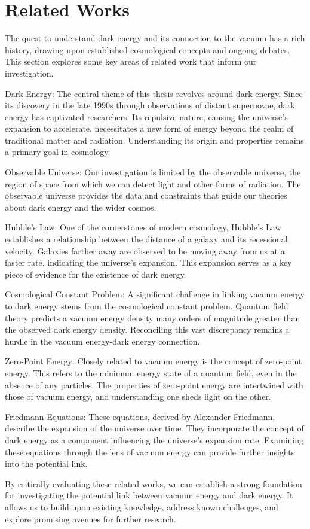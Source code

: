\section{Related Works}
The quest to understand dark energy and its connection to the vacuum has a rich history, drawing upon established cosmological concepts and ongoing debates. This section explores some key areas of related work that inform our investigation.

Dark Energy: The central theme of this thesis revolves around dark energy. Since its discovery in the late 1990s through observations of distant supernovae, dark energy has captivated researchers. Its repulsive nature, causing the universe's expansion to accelerate, necessitates a new form of energy beyond the realm of traditional matter and radiation. Understanding its origin and properties remains a primary goal in cosmology.

Observable Universe:  Our investigation is limited by the observable universe, the region of space from which we can detect light and other forms of radiation.  The observable universe provides the data and constraints that guide our theories about dark energy and the wider cosmos.

Hubble's Law:  One of the cornerstones of modern cosmology, Hubble's Law establishes a relationship between the distance of a galaxy and its recessional velocity. Galaxies farther away are observed to be moving away from us at a faster rate, indicating the universe's expansion. This expansion serves as a key piece of evidence for the existence of dark energy.

Cosmological Constant Problem:  A significant challenge in linking vacuum energy to dark energy stems from the cosmological constant problem. Quantum field theory predicts a vacuum energy density many orders of magnitude greater than the observed dark energy density. Reconciling this vast discrepancy remains a hurdle in the vacuum energy-dark energy connection.

Zero-Point Energy:  Closely related to vacuum energy is the concept of zero-point energy. This refers to the minimum energy state of a quantum field, even in the absence of any particles.  The properties of zero-point energy are intertwined with those of vacuum energy, and understanding one sheds light on the other.

Friedmann Equations:  These equations, derived by Alexander Friedmann, describe the expansion of the universe over time. They incorporate the concept of dark energy as a component influencing the universe's expansion rate. Examining these equations through the lens of vacuum energy can provide further insights into the potential link.

By critically evaluating these related works, we can establish a strong foundation for investigating the potential link between vacuum energy and dark energy. It allows us to build upon existing knowledge, address known challenges, and explore promising avenues for further research.